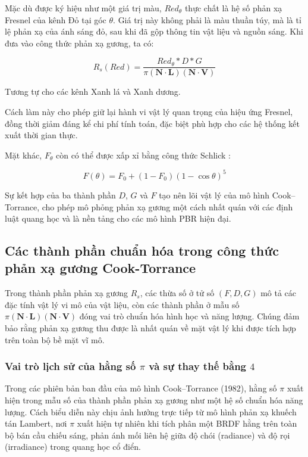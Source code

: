Mặc dù được ký hiệu như một giá trị màu, $Red_\theta$ thực chất là hệ số phản xạ Fresnel của kênh Đỏ tại góc $\theta$. Giá trị này không phải là màu thuần túy, mà là tỉ lệ phản xạ của ánh sáng đỏ, sau khi đã gộp thông tin vật liệu và nguồn sáng. Khi đưa vào công thức phản xạ gương, ta có:

\begin{equation}
	R_s(Red) = \frac{Red_\theta * D * G}{\pi (\mathbf{N} \cdot \mathbf{L})(\mathbf{N} \cdot \mathbf{V})}
\end{equation}

Tương tự cho các kênh Xanh lá và Xanh dương.

Cách làm này cho phép giữ lại hành vi vật lý quan trọng của hiệu ứng Fresnel, đồng thời giảm đáng kể chi phí tính toán, đặc biệt phù hợp cho các hệ thống kết xuất thời gian thực.

Mặt khác, $F_\theta$ còn có thể được xấp xỉ bằng công thức Schlick \cite{schlick_inexpensive_1994}:

\begin{equation}
	F(\theta) = F_0 + (1 - F_0)(1 - \cos \theta)^5
\end{equation}

Sự kết hợp của ba thành phần $D$, $G$ và $F$ tạo nên lõi vật lý của mô hình Cook–Torrance, cho phép mô phỏng phản xạ gương một cách nhất quán với các định luật quang học và là nền tảng cho các mô hình PBR hiện đại.

\subsection{Các thành phần chuẩn hóa trong công thức phản xạ gương Cook-Torrance}

Trong thành phần phản xạ gương $R_s$, các thừa số ở tử số $(F, D, G)$ mô tả các đặc tính vật lý vi mô của vật liệu, còn các thành phần ở mẫu số $\pi (\mathbf{N} \cdot \mathbf{L})(\mathbf{N} \cdot \mathbf{V})$ đóng vai trò chuẩn hóa hình học và năng lượng. Chúng đảm bảo rằng phản xạ gương thu được là nhất quán về mặt vật lý khi được tích hợp trên toàn bộ bề mặt vĩ mô.

\subsubsection{Vai trò lịch sử của hằng số $\pi$ và sự thay thế bằng $4$}

Trong các phiên bản ban đầu của mô hình Cook--Torrance (1982), hằng số $\pi$ xuất hiện trong mẫu số của thành phần phản xạ gương như một hệ số chuẩn hóa năng lượng. Cách biểu diễn này chịu ảnh hưởng trực tiếp từ mô hình phản xạ khuếch tán Lambert, nơi $\pi$ xuất hiện tự nhiên khi tích phân một BRDF hằng trên toàn bộ bán cầu chiếu sáng, phản ánh mối liên hệ giữa độ chói (radiance) và độ rọi (irradiance) trong quang học cổ điển.

